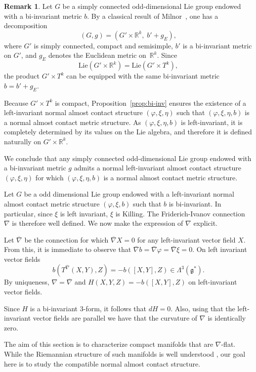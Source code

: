 \documentclass{article}
\theoremstyle{definition}
\newtheorem{rmk}[thm]{Remark}
\newcommand{\g}{\mathfrak{g}}
\renewcommand{\phi}{\varphi}
\numberwithin{equation}{section}
\begin{document}
\begin{rmk} \label{rmk:3}
Let $G$ be a simply connected odd-dimensional Lie group endowed with a bi-invariant metric $b$. 
By a classical result of Milnor~\cite{Mil}, one has a decomposition
\[
(G,g) = (G' \times \mathbb{R}^k,\; b' + g_E),
\]
where $G'$ is simply connected, compact and semisimple, $b'$ is a bi-invariant metric on $G'$, and $g_E$ denotes the Euclidean metric on~$\mathbb{R}^k$. 
Since 
\[
\mathrm{Lie}(G' \times \mathbb{R}^k) = \mathrm{Lie}(G' \times T^k),
\]
the product $G' \times T^k$ can be equipped with the same bi-invariant metric $b = b' + g_E$.

Because $G' \times T^k$ is compact, Proposition~\ref{prop:bi-inv} ensures the existence of a left-invariant normal almost contact structure $(\phi,\xi,\eta)$ such that $(\phi,\xi, \eta, b)$ is a normal almost contact metric structure. 
As $(\phi,\xi, \eta, b)$ is left-invariant, it is completely determined by its values on the Lie algebra, and therefore it is defined naturally on $G' \times \mathbb{R}^k$.

We conclude that any simply connected odd-dimensional Lie group endowed with a bi-invariant metric $g$ admits a normal left-invariant almost contact structure $(\phi,\xi,\eta)$ for which $(\phi,\xi,\eta, b)$ is a normal almost contact metric structure.
\end{rmk}

Let $G$ be a odd dimensional Lie group endowed with a left-invariant normal almost contact metric structure $(\phi,\xi,b)$ such that $b$ is bi-invariant. 
 In particular, since $\xi$ is left invariant, $\xi$ is Killing. The Friderich-Ivanov connection $\nabla$ is therefore well defined. We now make the expression of $\nabla$ explicit.  \par
Let $\overline{\nabla}$ be the connection for which $\overline{\nabla}X=0$ for any left-invariant vector field $X$. From this, it is immediate to observe that $\overline{\nabla}b=\overline{\nabla}\phi=\overline{\nabla}\xi=0$. On left invariant vector fields
\[
b(T^{\overline{\nabla}}(X,Y),Z)=-b([X,Y],Z) \in \Lambda^3(\g^*). 
\]
By uniqueness, $\nabla=\overline{\nabla}$ and $H(X,Y,Z)=-b([X,Y],Z)$ on left-invariant vector fields. \par
Since $H$ is a bi-invariant $3$-form, it follows that $dH=0$. Also, using that the left-invariant vector fields are parallel we have that the curvature of $\nabla$ is identically zero.  \par
\medskip
\medskip
The aim of this section is to characterize compact manifolds that are $\nabla$-flat.  
While the Riemannian structure of such manifolds is well understood \cite{CS1,CS2,AF}, our goal here is to study the 
compatible normal almost contact structure.
\end{document}
